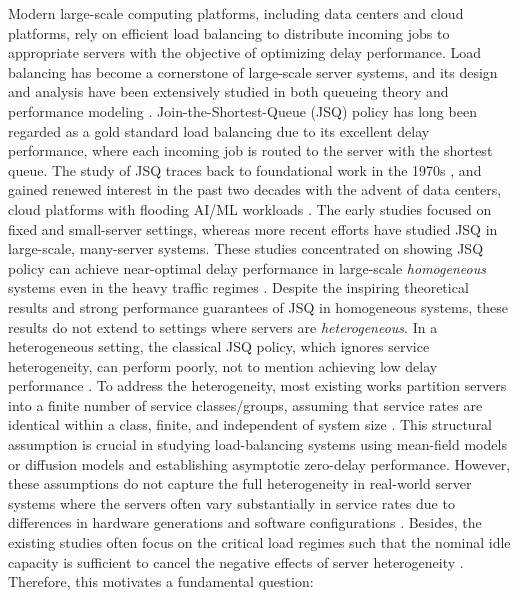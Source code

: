 \documentclass[11pt,oneside,letter]{article}
\begin{document}
Modern large-scale computing platforms, including data centers and cloud platforms, rely on efficient load balancing to distribute incoming jobs to appropriate servers with the objective of optimizing delay performance. Load balancing has become a cornerstone of large-scale server systems, and its design and analysis have been extensively studied in both queueing theory and performance modeling \cite{Mit_96,VveDobKar_96,LuXieKli_11, harchol-balter_2013}. Join-the-Shortest-Queue (JSQ) policy has long been regarded as a gold standard load balancing due to its excellent delay performance, where each incoming job is routed to the server with the shortest queue. The study of JSQ traces back to foundational work in the 1970s \cite{Win_77,Web_78}, and gained renewed interest in the past two decades with the advent of data centers, cloud platforms with flooding AI/ML workloads \cite{KwoLiZhu_23, FuXueHua_24, KunAnjAnk_25}. The early studies focused on fixed and small-server settings, whereas more recent efforts have studied JSQ in large-scale, many-server systems. These studies concentrated on showing JSQ policy can achieve near-optimal delay performance in large-scale {\it homogeneous} systems even in the heavy traffic regimes \cite{EscGam_18,Bra_20}. Despite the inspiring theoretical results and strong performance guarantees of JSQ in homogeneous systems, these results do not extend to settings where servers are {\it heterogeneous}. 
In a  heterogeneous setting, the classical JSQ policy, which ignores service heterogeneity, can perform poorly, not to mention achieving low delay performance \cite{GarJalWic_21}. 
To address the heterogeneity, most existing works partition servers into a finite number of service classes/groups, assuming that service rates are identical within a class, finite, and independent of system size \cite{VanCom_21,GarJalWic_21,AbuDorGar_22,AbuDorGar_24,BhaBukMuk_25}. This structural assumption is crucial in studying load-balancing systems using mean-field models or diffusion models and establishing asymptotic zero-delay performance. 
However, these assumptions do not capture the full heterogeneity in real-world server systems where the servers often vary substantially in service rates due to differences in hardware generations and software configurations \cite{SubArfLin_23, UmOhKan_24}.  
Besides, the existing studies often focus on the critical load regimes such that the nominal idle capacity is sufficient to cancel the negative effects of server heterogeneity \cite{Sto_15}.  
Therefore, this motivates a fundamental question:
\end{document}
